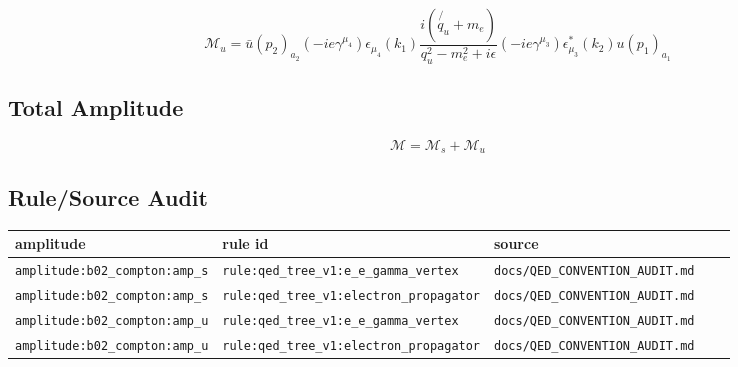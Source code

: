 \documentclass[11pt]{article}
\begin{document}
\begin{equation}
\mathcal{M}_{u} = \bar u(p_{2})_{a_{2}}\left(-i e \gamma^{\mu_{4}}\right)\epsilon_{\mu_{4}}(k_{1})\frac{i(\not{q_{u}}+m_e)}{q_{u}^2-m_e^2+i\epsilon}\left(-i e \gamma^{\mu_{3}}\right)\epsilon^{*}_{\mu_{3}}(k_{2})u(p_{1})_{a_{1}}
\end{equation}

\subsection*{Total Amplitude}
\begin{equation}
\mathcal{M} = \mathcal{M}_{s} + \mathcal{M}_{u}
\end{equation}

\subsection*{Rule/Source Audit}
\begin{longtable}{p{0.24\linewidth}p{0.22\linewidth}p{0.38\linewidth}}
\toprule
amplitude & rule id & source \\
\midrule
\texttt{amplitude:b02\_compton:amp\_s} & \texttt{rule:qed\_tree\_v1:e\_e\_gamma\_vertex} & \texttt{docs/QED\_CONVENTION\_AUDIT.md} \\
\texttt{amplitude:b02\_compton:amp\_s} & \texttt{rule:qed\_tree\_v1:electron\_propagator} & \texttt{docs/QED\_CONVENTION\_AUDIT.md} \\
\texttt{amplitude:b02\_compton:amp\_u} & \texttt{rule:qed\_tree\_v1:e\_e\_gamma\_vertex} & \texttt{docs/QED\_CONVENTION\_AUDIT.md} \\
\texttt{amplitude:b02\_compton:amp\_u} & \texttt{rule:qed\_tree\_v1:electron\_propagator} & \texttt{docs/QED\_CONVENTION\_AUDIT.md} \\
\bottomrule
\end{longtable}
\end{document}
